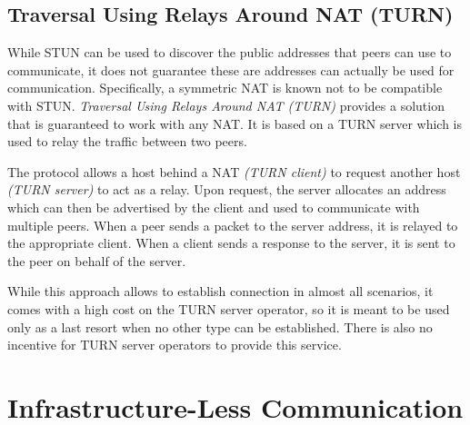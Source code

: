 \subsection{Traversal Using Relays Around NAT (TURN)}

While STUN can be used to discover the public addresses that peers can use to communicate, it does not guarantee these are addresses can actually be used for communication. Specifically, a symmetric NAT is known not to be compatible with STUN. \textit{Traversal Using Relays Around NAT (TURN)} provides a solution that is guaranteed to work with any NAT. It is based on a TURN server which is used to relay the traffic between two peers.

The protocol allows a host behind a NAT \textit{(TURN client)} to request another host \textit{(TURN server)} to act as a relay. Upon request, the server allocates an address which can then be advertised by the client and used to communicate with multiple peers. When a peer sends a packet to the server address, it is relayed to the appropriate client. When a client sends a response to the server, it is sent to the peer on behalf of the server.

While this approach allows to establish connection in almost all scenarios, it comes with a high cost on the TURN server operator, so it is meant to be used only as a last resort when no other type can be established. There is also no incentive for TURN server operators to provide this service.





\section{Infrastructure-Less Communication}
\label{soa-infrastructureless-communication}

